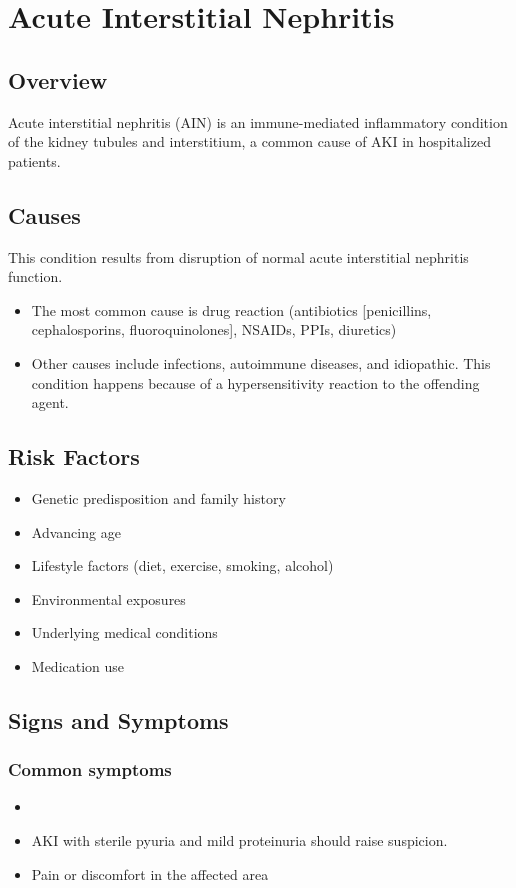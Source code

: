 \chapter{Acute Interstitial Nephritis}
\label{sec:Acute Interstitial Nephritis}

\section{Overview}
Acute interstitial nephritis (AIN) is an immune-mediated inflammatory condition of the kidney tubules and interstitium, a common cause of AKI in hospitalized patients.
\section{Causes}
This condition results from disruption of normal acute interstitial nephritis function.

\begin{itemize}[noitemsep]
  \item The most common cause is drug reaction (antibiotics [penicillins, cephalosporins, fluoroquinolones], NSAIDs, PPIs, diuretics)
  \item Other causes include infections, autoimmune diseases, and idiopathic. This condition happens because of a hypersensitivity reaction to the offending agent.
\end{itemize}
\section{Risk Factors}


\begin{itemize}[noitemsep]
  \item Genetic predisposition and family history
  \item Advancing age
  \item Lifestyle factors (diet, exercise, smoking, alcohol)
  \item Environmental exposures
  \item Underlying medical conditions
  \item Medication use
\end{itemize}
\section{Signs and Symptoms}

\subsection{Common symptoms}
\begin{itemize}[noitemsep]
  \item \item AKI with sterile pyuria and mild proteinuria should raise suspicion.

  \item Pain or discomfort in the affected area
  \end{itemize}

